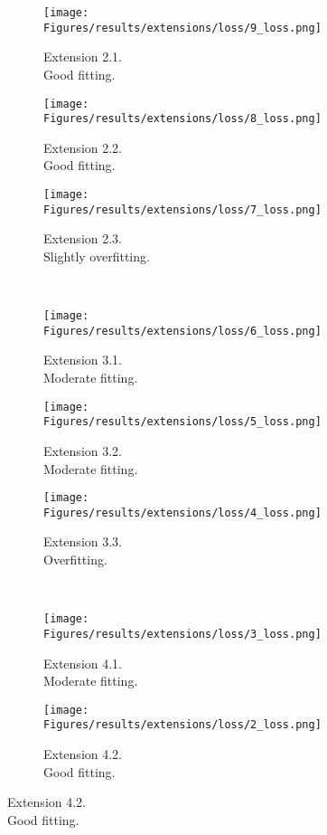 \begin{figure}[!hp]
\begin{subfigure}{.325\textwidth}
        \centering
        \texttt{[image: Figures/results/extensions/loss/9\_loss.png]}
        \caption{Extension 2.1.\\Good fitting.}
    \end{subfigure}
    \begin{subfigure}{.325\textwidth}
        \centering
        \texttt{[image: Figures/results/extensions/loss/8\_loss.png]}
        \caption{Extension 2.2.\\Good fitting.}
    \end{subfigure}
    \begin{subfigure}{.325\textwidth}
        \centering
        \texttt{[image: Figures/results/extensions/loss/7\_loss.png]}
        \caption{Extension 2.3.\\Slightly overfitting.}
    \end{subfigure}
    \\
    \begin{subfigure}{.325\textwidth}
        \centering
        \texttt{[image: Figures/results/extensions/loss/6\_loss.png]}
        \caption{Extension 3.1.\\Moderate fitting.}
    \end{subfigure}
    \begin{subfigure}{.325\textwidth}
        \centering
        \texttt{[image: Figures/results/extensions/loss/5\_loss.png]}
        \caption{Extension 3.2.\\Moderate fitting.}
    \end{subfigure}
    \begin{subfigure}{.325\textwidth}
        \centering
        \texttt{[image: Figures/results/extensions/loss/4\_loss.png]}
        \caption{Extension 3.3.\\Overfitting.}
    \end{subfigure}
    \\
    \begin{subfigure}{.325\textwidth}
        \centering
        \texttt{[image: Figures/results/extensions/loss/3\_loss.png]}
        \caption{Extension 4.1.\\Moderate fitting.}
    \end{subfigure}
    \begin{subfigure}{.325\textwidth}
        \centering
        \texttt{[image: Figures/results/extensions/loss/2\_loss.png]}
        \caption{Extension 4.2.\\Good fitting.}

\end{subfigure}
\end{figure}
